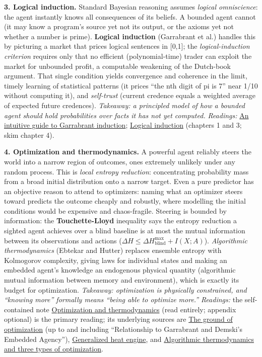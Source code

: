 \documentclass[11pt]{article}
\begin{document}
\textbf{3. Logical induction.} Standard Bayesian reasoning assumes \emph{logical omniscience}: the agent instantly knows all consequences of its beliefs. A bounded agent cannot (it may know a program's source yet not its output, or the axioms yet not whether a number is prime). \textbf{Logical induction} (Garrabrant et al.) handles this by picturing a market that prices logical sentences in {[}0,1{]}; the \emph{logical-induction criterion} requires only that no efficient (polynomial-time) trader can exploit the market for unbounded profit, a computable weakening of the Dutch-book argument. That single condition yields convergence and coherence in the limit, timely learning of statistical patterns (it prices ``the nth digit of pi is 7'' near 1/10 without computing it), and \emph{self-trust} (current credence equals a weighted average of expected future credences). \emph{Takeaway: a principled model of how a bounded agent should hold probabilities over facts it has not yet computed.} \emph{Readings:} \href{https://www.lesswrong.com/posts/y5GftLezdozEHdXkL/an-intuitive-guide-to-garrabrant-induction}{An intuitive guide to Garrabrant induction}; \href{https://arxiv.org/pdf/1609.03543}{Logical induction} (chapters 1 and 3; skim chapter 4).

\textbf{4. Optimization and thermodynamics.} A powerful agent reliably steers the world into a narrow region of outcomes, ones extremely unlikely under any random process. This is \emph{local entropy reduction}: concentrating probability mass from a broad initial distribution onto a narrow target. Even a pure predictor has an objective reason to attend to optimizers: naming what an optimizer steers toward predicts the outcome cheaply and robustly, where modelling the initial conditions would be expensive and chaos-fragile. Steering is bounded by information: the \textbf{Touchette-Lloyd} inequality says the entropy reduction a sighted agent achieves over a blind baseline is at most the mutual information between its observations and actions ($\Delta H \leq \Delta H_{\text{blind}}^{\max} + I(X;A)$). \emph{Algorithmic thermodynamics} (Ebtekar and Hutter) replaces ensemble entropy with Kolmogorov complexity, giving laws for individual states and making an embedded agent's knowledge an endogenous physical quantity (algorithmic mutual information between memory and environment), which is exactly its budget for optimization. \emph{Takeaway: optimization is physically constrained, and ``knowing more'' formally means ``being able to optimize more.''} \emph{Readings:} the self-contained note \href{/agency/optimization-thermodynamics}{Optimization and thermodynamics} (read entirely; appendix optional) is the primary reading; its underlying sources are \href{https://www.lesswrong.com/posts/znfkdCoHMANwqc2WE/the-ground-of-optimization-1}{The ground of optimization} (up to and including ``Relationship to Garrabrant and Demski's Embedded Agency''), \href{https://www.lesswrong.com/posts/uKWXktrR7KpbgZAs4/generalized-heat-engine}{Generalized heat engine}, and \href{https://www.lesswrong.com/posts/CJRxQiTKEzior7jGq/algorithmic-thermodynamics-and-three-types-of-optimization}{Algorithmic thermodynamics and three types of optimization}.
\end{document}
